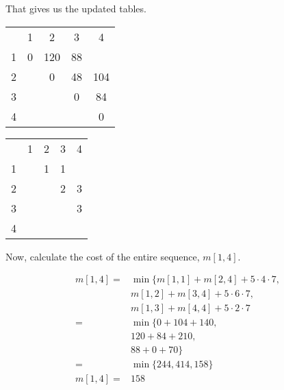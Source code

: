 \documentclass[12pt]{article}
\begin{document}
\newpage

That gives us the updated tables.
\begin{center}
\label*{$m$}
\begin{tabular}{ c|c|c|c|c| }
    \multicolumn{1}{c}{}
    & \multicolumn{1}{c}{1}
    & \multicolumn{1}{c}{2}
    & \multicolumn{1}{c}{3}
    & \multicolumn{1}{c}{4}\\

    \cline{2-5}
        1 & 0 & 120 & 88 &  \\
    \cline{2-5}
        2 &  & 0 & 48 & 104 \\
    \cline{2-5}
        3 &  &  & 0 & 84 \\
    \cline{2-5}
        4 &  &  &  & 0 \\
    \cline{2-5}
\end{tabular}
\end{center}

\begin{center}
\label*{$s$}
\begin{tabular}{ c|c|c|c|c| }
    \multicolumn{1}{c}{}
    & \multicolumn{1}{c}{1}
    & \multicolumn{1}{c}{2}
    & \multicolumn{1}{c}{3}
    & \multicolumn{1}{c}{4}\\

    \cline{2-5}
        1 &  & 1 & 1 &  \\
    \cline{2-5}
        2 &  &  & 2 & 3 \\
    \cline{2-5}
        3 &  &  &  & 3 \\
    \cline{2-5}
        4 &  &  &  &  \\
    \cline{2-5}
\end{tabular}
\end{center}

Now, calculate the cost of the entire sequence, $m[1, 4]$.

\begin{equation*}
    \begin{split}
        m[1, 4] = & \min\{ m[1, 1] + m[2, 4] + 5\cdot4\cdot7,\\
                  & m[1, 2] + m[3, 4] + 5\cdot6\cdot7, \\
                  & m[1, 3] + m[4, 4] + 5\cdot2\cdot7 \\
                = & \min\{ 0+104+140,\\
                  & 120+84+210, \\
                  & 88+0+70 \}\\
                = & \min\{ 244, 414, 158\}\\
        m[1, 4] = & 158
    \end{split}
\end{equation*}
\end{document}
